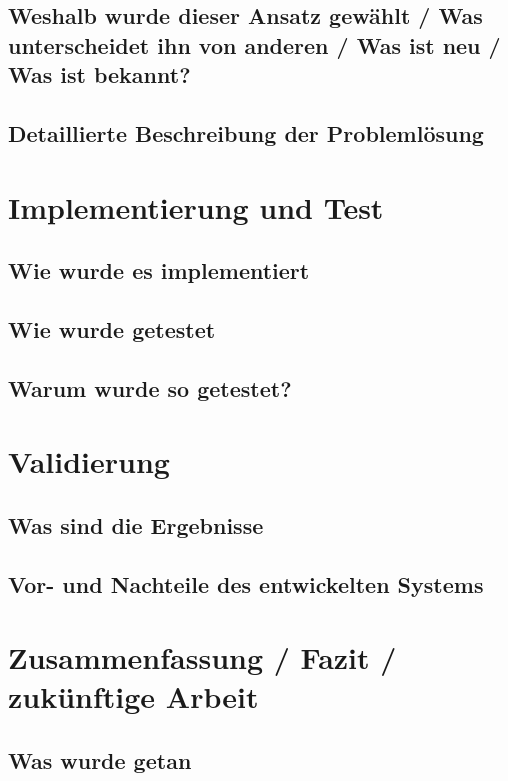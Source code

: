\documentclass[a4paper,12pt]{article}
\begin{document}
\subsection{Weshalb wurde dieser Ansatz gewählt / Was unterscheidet ihn von anderen / Was ist neu / Was ist bekannt?}

\subsection{Detaillierte Beschreibung der Problemlösung}

\section{Implementierung und Test}

\subsection{Wie wurde es implementiert}

\subsection{Wie wurde getestet}

\subsection{Warum wurde so getestet?}

\section{Validierung}

\subsection{Was sind die Ergebnisse}

\subsection{Vor- und Nachteile des entwickelten Systems}

\section{Zusammenfassung / Fazit / zukünftige Arbeit}

\subsection{Was wurde getan}
\end{document}
